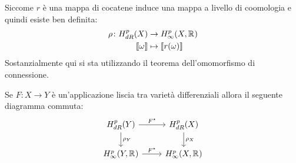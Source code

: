 \eproof
Siccome $ r $ è una mappa di cocatene induce una mappa a livello di coomologia
e quindi esiste ben definita:
\begin{align*}
  \rho \colon H^p_{dR}(X) & \to H^p_\infty (X, \mathbb{R}^{}) \\
  \llbracket \omega \rrbracket & \mapsto \llbracket r(\omega) \rrbracket
\end{align*}
Sostanzialmente qui si sta utilizzando il teorema dell'omomorfismo di connessione.
\begin{lemma}
  Se $ F \colon X \to Y $ è un'applicazione liscia tra varietà differenziali allora
  il seguente diagramma commuta:
  \[
    \begin{tikzcd}
      H^p_{dR}(Y) \rar{F^\star} \dar{\rho_Y} & H^p_{dR}(X) \dar{\rho_X} \\
      H^p_\infty(Y, \RN{}) \rar{F^\star} & H^p_\infty(X, \RN{})
    \end{tikzcd}
  \]
\end{lemma}
